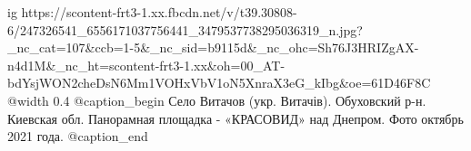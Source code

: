  
 
 
 
 

\ifcmt
  ig https://scontent-frt3-1.xx.fbcdn.net/v/t39.30808-6/247326541_6556171037756441_3479537738295036319_n.jpg?_nc_cat=107&ccb=1-5&_nc_sid=b9115d&_nc_ohc=Sh76J3HRIZgAX-n4d1M&_nc_ht=scontent-frt3-1.xx&oh=00_AT-bdYsjWON2cheDsN6Mm1VOHxVbV1oN5XnraX3eG_kIbg&oe=61D46F8C
  @width 0.4
  @caption_begin
    Село Витачов (укр. Витачів). Обуховский р-н. Киевская обл. 
    Панорамная площадка - «КРАСОВИД» над Днепром. Фото октябрь 2021 года.
  @caption_end
\fi
